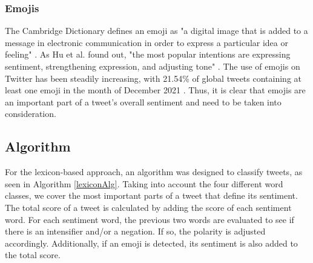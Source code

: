 
\subsubsection{Emojis}
The Cambridge Dictionary defines an emoji as "a digital image that is added to a message in electronic communication in order to express a particular idea or feeling" \cite{cambridgeEmoji}. As Hu et al. found out, "the most popular intentions are expressing sentiment, strengthening expression, and adjusting tone" \cite[p.~109]{Hu_Guo_Sun_Nguyen_Luo_2017}. The use of emojis on Twitter has been steadily increasing, with 21.54\% of global tweets containing at least one emoji in the month of December 2021 \cite{emojiStatistic}. Thus, it is clear that emojis are an important part of a tweet's overall sentiment and need to be taken into consideration.



\subsection{Algorithm}

For the lexicon-based approach, an algorithm was designed to classify tweets, as seen in Algorithm \ref{lexiconAlg}. Taking into account the four different word classes, we cover the most important parts of a tweet that define its sentiment. The total score of a tweet is calculated by adding the score of each sentiment word. For each sentiment word, the previous two words are evaluated to see if there is an intensifier and/or a negation. If so, the polarity is adjusted accordingly. Additionally, if an emoji is detected, its sentiment is also added to the total score.


